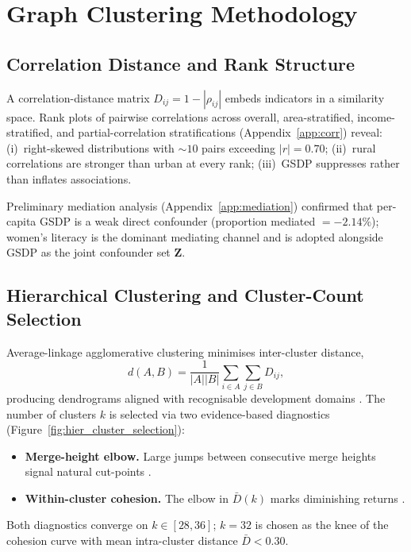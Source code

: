 \documentclass[12pt,a4paper]{report}
\newcommand{\bZ}{\mathbf{Z}}
\begin{document}
\chapter{Graph Clustering Methodology}
\label{chap:clustering}

\section{Correlation Distance and Rank Structure}

A correlation-distance matrix $D_{ij} = 1 - |\rho_{ij}|$ embeds indicators in a
similarity space.
Rank plots of pairwise correlations across overall, area-stratified,
income-stratified, and partial-correlation stratifications
(Appendix~\ref{app:corr}) reveal: (i)~right-skewed distributions with ${\sim}10$
pairs exceeding $|r|=0.70$; (ii)~rural correlations are stronger than urban at
every rank; (iii)~GSDP suppresses rather than inflates associations.

Preliminary mediation analysis (Appendix~\ref{app:mediation}) confirmed that
per-capita GSDP is a weak direct confounder (proportion mediated $=-2.14\%$);
women's literacy is the dominant mediating channel and is adopted alongside GSDP
as the joint confounder set $\bZ$.

\section{Hierarchical Clustering and Cluster-Count Selection}

Average-linkage agglomerative clustering minimises inter-cluster distance,
\[
d(A,B) = \frac{1}{|A||B|}\sum_{i\in A}\sum_{j\in B} D_{ij},
\]
producing dendrograms aligned with recognisable development domains \citep{murtagh2014ward}.
The number of clusters $k$ is selected via two evidence-based diagnostics
(Figure~\ref{fig:hier_cluster_selection}):
\begin{itemize}[itemsep=2pt]
\item \textbf{Merge-height elbow.} Large jumps between consecutive merge heights
  signal natural cut-points \citep{tibshirani2001estimating}.
\item \textbf{Within-cluster cohesion.} The elbow in
  $\bar{D}(k)$ marks diminishing returns \citep{thorndike1953belongs}.
\end{itemize}
Both diagnostics converge on $k\in[28,36]$; $k=32$ is chosen as the knee of the
cohesion curve with mean intra-cluster distance $\bar{D}<0.30$.
\end{document}
